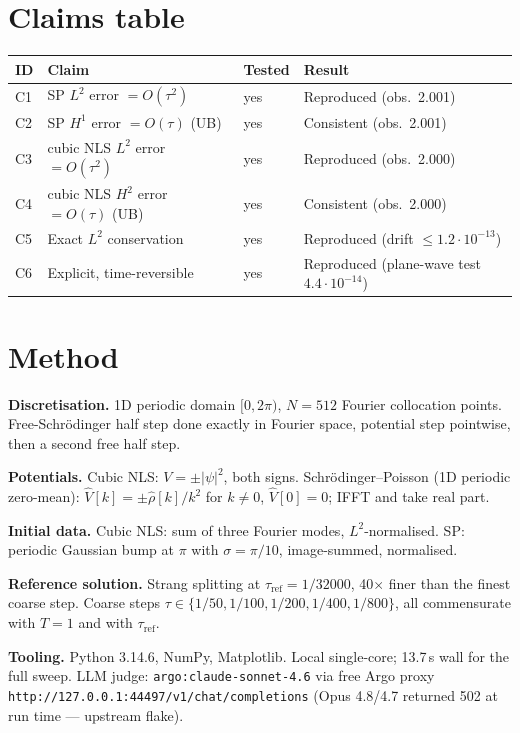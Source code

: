 \documentclass[11pt]{article}
\begin{document}
\section{Claims table}

\begin{center}\small
\begin{tabular}{@{}llll@{}}
\toprule
ID & Claim & Tested & Result \\ \midrule
C1 & SP $L^2$ error $=O(\tau^2)$    & yes & Reproduced (obs.\ 2.001) \\
C2 & SP $H^1$ error $=O(\tau)$ (UB) & yes & Consistent (obs.\ 2.001) \\
C3 & cubic NLS $L^2$ error $=O(\tau^2)$ & yes & Reproduced (obs.\ 2.000) \\
C4 & cubic NLS $H^2$ error $=O(\tau)$ (UB) & yes & Consistent (obs.\ 2.000) \\
C5 & Exact $L^2$ conservation      & yes & Reproduced (drift $\le 1.2\!\cdot\!10^{-13}$) \\
C6 & Explicit, time-reversible     & yes & Reproduced (plane-wave test $4.4\!\cdot\!10^{-14}$) \\
\bottomrule
\end{tabular}
\end{center}

\section{Method}

\textbf{Discretisation.} 1D periodic domain $[0,2\pi)$, $N=512$ Fourier
collocation points. Free-Schr\"odinger half step done exactly in Fourier space,
potential step pointwise, then a second free half step.

\textbf{Potentials.} Cubic NLS: $V=\pm|\psi|^2$, both signs. Schr\"odinger--Poisson
(1D periodic zero-mean): $\hat V[k]=\pm\hat\rho[k]/k^2$ for $k\ne 0$,
$\hat V[0]=0$; IFFT and take real part.

\textbf{Initial data.} Cubic NLS: sum of three Fourier modes, $L^2$-normalised.
SP: periodic Gaussian bump at $\pi$ with $\sigma=\pi/10$, image-summed, normalised.

\textbf{Reference solution.} Strang splitting at $\tau_{\mathrm{ref}}=1/32000$,
40$\times$ finer than the finest coarse step. Coarse steps
$\tau\in\{1/50,1/100,1/200,1/400,1/800\}$, all commensurate with $T=1$ and with
$\tau_{\mathrm{ref}}$.

\textbf{Tooling.} Python 3.14.6, NumPy, Matplotlib. Local single-core; 13.7\,s
wall for the full sweep. LLM judge: \texttt{argo:claude-sonnet-4.6} via free
Argo proxy \texttt{http://127.0.0.1:44497/v1/chat/completions} (Opus 4.8/4.7
returned 502 at run time --- upstream flake).
\end{document}
